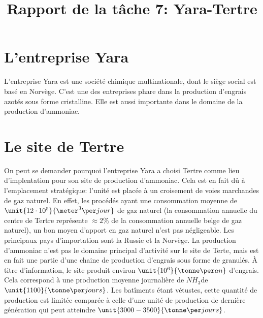 

\title{Rapport de la tâche 7: Yara-Tertre}
\maketitle
\newpage
\section*{L'entreprise Yara}
L'entreprise Yara est une société chimique multinationale, dont le siège social est basé en Norvège. C'est une des entreprises phare dans la production d'engrais azotés sous forme cristalline. Elle est aussi importante dans le domaine de la production d'ammoniac.
\section*{Le site de Tertre}
On peut se demander pourquoi l'entreprise Yara a choisi Tertre comme lieu d'implentation pour son site de production d'ammoniac. Cela est en fait dû à l'emplacement stratégique: l'unité est placée à un croisement de voies marchandes de gaz naturel. En effet, les procédés ayant une consommation moyenne de $\unit{12 \cdot 10^5}{\meter^3\per jour}$ de gaz naturel (la consommation annuelle du centre de Tertre représente $\approx 2\%$ de la consommation annuelle belge de gaz naturel), un bon moyen d'apport en gaz naturel n'est pas négligeable. Les principaux pays d'importation sont la Russie et la Norvège. La production d'ammoniac n'est pas le domaine principal d'activité sur le site de Terte, mais est en fait une partie d'une chaine de production d'engrais sous forme de granulés. À titre d'information, le site produit environ $\unit{10^6}{\tonne\per an}$ d'engrais. Cela correspond à une production moyenne journalière de $NH_3$de $\unit{1100}{\tonne\per jours}$. Les batîments étant vétustes, cette quantité de production est limitée comparée à celle d'une unité de production de dernière génération qui peut atteindre $\unit{3000-3500}{\tonne\per jours}$. 
